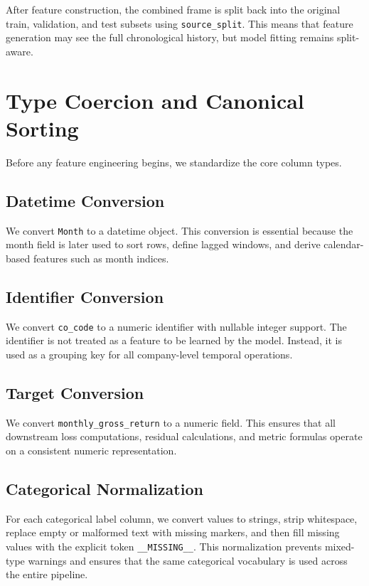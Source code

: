 \documentclass[11pt]{article}
\begin{document}
After feature construction, the combined frame is split back into the original train, validation, and test subsets using \texttt{source\_split}. This means that feature generation may see the full chronological history, but model fitting remains split-aware.

\section{Type Coercion and Canonical Sorting}

Before any feature engineering begins, we standardize the core column types.

\subsection{Datetime Conversion}

We convert \texttt{Month} to a datetime object. This conversion is essential because the month field is later used to sort rows, define lagged windows, and derive calendar-based features such as month indices.

\subsection{Identifier Conversion}

We convert \texttt{co\_code} to a numeric identifier with nullable integer support. The identifier is not treated as a feature to be learned by the model. Instead, it is used as a grouping key for all company-level temporal operations.

\subsection{Target Conversion}

We convert \texttt{monthly\_gross\_return} to a numeric field. This ensures that all downstream loss computations, residual calculations, and metric formulas operate on a consistent numeric representation.

\subsection{Categorical Normalization}

For each categorical label column, we convert values to strings, strip whitespace, replace empty or malformed text with missing markers, and then fill missing values with the explicit token \texttt{\_\_MISSING\_\_}. This normalization prevents mixed-type warnings and ensures that the same categorical vocabulary is used across the entire pipeline.
\end{document}
